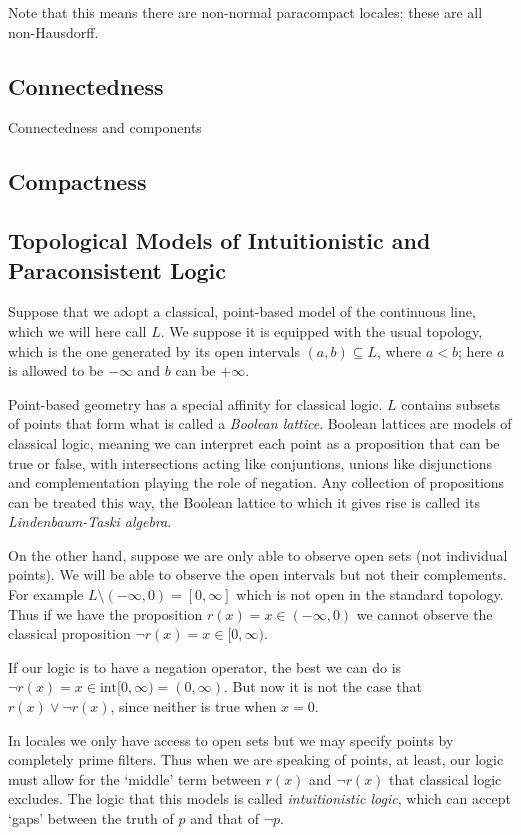 \documentclass[oneside,english]{amsbook}
\numberwithin{section}{chapter}
\theoremstyle{plain}
\theoremstyle{definition}
\begin{document}
Note that this means there are non-normal paracompact locales; these are all non-Hausdorff.

\subsection{Connectedness}

Connectedness and components


\subsection{Compactness}


\subsection{Topological Models of Intuitionistic and Paraconsistent Logic}

Suppose that we adopt a classical, point-based model of the continuous line, which we will here call $L$. We suppose it is equipped with the usual topology, which is the one generated by its open intervals $(a, b)\subseteq L$, where $a < b$; here $a$ is allowed to be $-\infty$ and $b$ can be $+\infty$. 

Point-based geometry has a special affinity for classical logic. $L$ contains subsets of points that form what is called a \emph{Boolean lattice}. Boolean lattices are models of classical logic, meaning we can interpret each point as a proposition that can be true or false, with intersections acting like conjuntions, unions like disjunctions and complementation playing the role of negation. Any collection of propositions can be treated this way, the Boolean lattice to which it gives rise is called its \emph{Lindenbaum-Taski algebra}.

On the other hand, suppose we are only able to observe open sets (not individual points). We will be able to observe the open intervals but not their complements. For example $L\setminus(-\infty, 0) = [0, \infty]$ which is not open in the standard topology. Thus if we have the proposition $r(x) = x\in (-\infty, 0)$ we cannot observe the classical proposition $\lnot r(x) = x\in [0, \infty)$. 

If our logic is to have a negation operator, the best we can do is $\lnot r(x) = x\in \text{int}[0, \infty) = (0, \infty)$. But now it is not the case that $r(x)\lor\lnot r(x)$, since neither is true when $x = 0$.

In locales we only have access to open sets but we may specify points by completely prime filters. Thus when we are speaking of points, at least, our logic must allow for the `middle' term between $r(x)$ and $\lnot r(x)$ that classical logic excludes. The logic that this models is called \emph{intuitionistic logic}, which can accept `gaps' between the truth of $p$ and that of $\lnot p$. 
\end{document}

